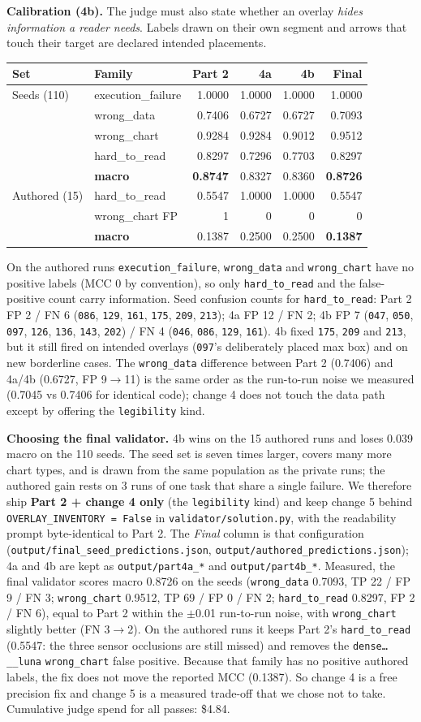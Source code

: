 \documentclass[11pt]{article}
\newcommand{\run}[1]{\texttt{#1}}
\newcommand{\FSexec}{1.0000}\newcommand{\FSdata}{0.7093}\newcommand{\FSchart}{0.9512}
\newcommand{\FShard}{0.8297}\newcommand{\FSmacro}{0.8726}
\newcommand{\FAhard}{0.5547}\newcommand{\FAfp}{0}\newcommand{\FAmacro}{0.1387}
\newcommand{\FINALVERDICT}{Measured, the final validator scores macro 0.8726 on the seeds (\texttt{wrong\_data} 0.7093, TP 22 / FP 9 / FN 3; \texttt{wrong\_chart} 0.9512, TP 69 / FP 0 / FN 2; \texttt{hard\_to\_read} 0.8297, FP 2 / FN 6), equal to Part 2 within the $\pm$0.01 run-to-run noise, with \texttt{wrong\_chart} slightly better (FN 3$\to$2). On the authored runs it keeps Part 2's \texttt{hard\_to\_read} (0.5547: the three sensor occlusions are still missed) and removes the \run{dense\ldots\_\_luna} \texttt{wrong\_chart} false positive. Because that family has no positive authored labels, the fix does not move the reported MCC (0.1387). So change 4 is a free precision fix and change 5 is a measured trade-off that we chose not to take. Cumulative judge spend for all passes: \$4.84.}
\begin{document}
\textbf{Calibration (4b).} The judge must also state whether an overlay
\emph{hides information a reader needs}. Labels drawn on their own segment and
arrows that touch their target are declared intended placements.
\begin{center}
\small
\begin{tabular}{llrrrr}
\toprule
Set & Family & Part 2 & 4a & 4b & \textbf{Final} \\
\midrule
Seeds (110) & execution\_failure & 1.0000 & 1.0000 & 1.0000 & \FSexec \\
 & wrong\_data & 0.7406 & 0.6727 & 0.6727 & \FSdata \\
 & wrong\_chart & 0.9284 & 0.9284 & 0.9012 & \FSchart \\
 & hard\_to\_read & 0.8297 & 0.7296 & 0.7703 & \FShard \\
 & \textbf{macro} & \textbf{0.8747} & 0.8327 & 0.8360 & \textbf{\FSmacro} \\
\midrule
Authored (15) & hard\_to\_read & 0.5547 & 1.0000 & 1.0000 & \FAhard \\
 & wrong\_chart FP & 1 & 0 & 0 & \FAfp \\
 & \textbf{macro} & 0.1387 & 0.2500 & 0.2500 & \textbf{\FAmacro} \\
\bottomrule
\end{tabular}
\end{center}
On the authored runs \texttt{execution\_failure}, \texttt{wrong\_data} and
\texttt{wrong\_chart} have no positive labels (MCC 0 by convention), so only
\texttt{hard\_to\_read} and the false-positive count carry information.
Seed confusion counts for \texttt{hard\_to\_read}: Part 2 FP 2 / FN 6
(\run{086}, \run{129}, \run{161}, \run{175}, \run{209}, \run{213}); 4a FP 12 / FN 2;
4b FP 7 (\run{047}, \run{050}, \run{097}, \run{126}, \run{136}, \run{143}, \run{202})
/ FN 4 (\run{046}, \run{086}, \run{129}, \run{161}). 4b fixed \run{175},
\run{209} and \run{213}, but it still fired on intended overlays (\run{097}'s
deliberately placed max box) and on new borderline cases. The
\texttt{wrong\_data} difference between Part 2 (0.7406) and 4a/4b (0.6727,
FP 9$\to$11) is the same order as the run-to-run noise we measured (0.7045 vs
0.7406 for identical code); change 4 does not touch the data path except by
offering the \texttt{legibility} kind.

\textbf{Choosing the final validator.} 4b wins on the 15 authored runs and
loses 0.039 macro on the 110 seeds. The seed set is seven times larger,
covers many more chart types, and is drawn from the same population as the
private runs; the authored gain rests on 3 runs of one task that share a
single failure. We therefore ship \textbf{Part 2 + change 4 only} (the
\texttt{legibility} kind) and keep change 5 behind
\texttt{OVERLAY\_INVENTORY = False} in \texttt{validator/solution.py}, with the
readability prompt byte-identical to Part 2. The \emph{Final} column is that
configuration (\texttt{output/final\_seed\_predictions.json},
\texttt{output/authored\_predictions.json}); 4a and 4b are kept as
\texttt{output/part4a\_*} and \texttt{output/part4b\_*}. \FINALVERDICT
\end{document}
